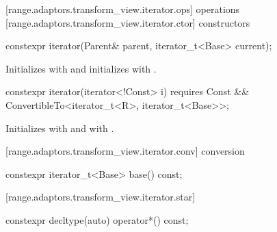 [range.adaptors.transform_view.iterator.ops]{ operations}
[range.adaptors.transform_view.iterator.ctor]{ constructors}

\begin{itemdecl}
constexpr iterator(Parent& parent, iterator_t<Base> current);
\end{itemdecl}

\begin{itemdescr}
\pnum
\effects Initializes  with  and
initializes  with .
\end{itemdescr}

%
\begin{itemdecl}
constexpr iterator(iterator<!Const> i)
  requires Const && ConvertibleTo<iterator_t<R>, iterator_t<Base>>;
\end{itemdecl}

\begin{itemdescr}
\pnum
\effects Initializes  with  and 
with .
\end{itemdescr}

[range.adaptors.transform_view.iterator.conv]{ conversion}

\begin{itemdecl}
constexpr iterator_t<Base> base() const;
\end{itemdecl}

\begin{itemdescr}
\pnum
\oldtxt{\returns}  
\end{itemdescr}

[range.adaptors.transform_view.iterator.star]{}

\begin{itemdecl}
constexpr decltype(auto) operator*() const;
\end{itemdecl}

\begin{itemdescr}
\pnum
\oldtxt{\returns} 
\end{itemdescr}

